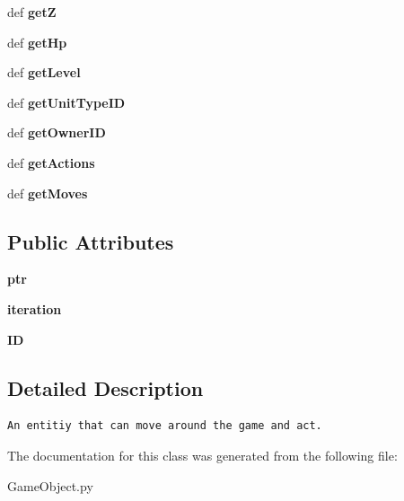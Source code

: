 \begin{CompactItemize}
\item 
\hypertarget{classGameObject_1_1Unit_4b32febb0f80ed604833338af2103b16}{
def \textbf{getZ}}
\label{classGameObject_1_1Unit_4b32febb0f80ed604833338af2103b16}

\item 
\hypertarget{classGameObject_1_1Unit_a0e958b475f8e784cab9e443405cc233}{
def \textbf{getHp}}
\label{classGameObject_1_1Unit_a0e958b475f8e784cab9e443405cc233}

\item 
\hypertarget{classGameObject_1_1Unit_b2bf3bbbd066d3b1ec4a6eac3819bb63}{
def \textbf{getLevel}}
\label{classGameObject_1_1Unit_b2bf3bbbd066d3b1ec4a6eac3819bb63}

\item 
\hypertarget{classGameObject_1_1Unit_5dc929b411abd60ea05bc9a45f53ed2c}{
def \textbf{getUnitTypeID}}
\label{classGameObject_1_1Unit_5dc929b411abd60ea05bc9a45f53ed2c}

\item 
\hypertarget{classGameObject_1_1Unit_7a78dc10a8f05d47c6216f0a1cee864e}{
def \textbf{getOwnerID}}
\label{classGameObject_1_1Unit_7a78dc10a8f05d47c6216f0a1cee864e}

\item 
\hypertarget{classGameObject_1_1Unit_d616480400b131d3faad00f63f553c37}{
def \textbf{getActions}}
\label{classGameObject_1_1Unit_d616480400b131d3faad00f63f553c37}

\item 
\hypertarget{classGameObject_1_1Unit_5aa36bd2ed0fa42becc2f3e15c4a2fbb}{
def \textbf{getMoves}}
\label{classGameObject_1_1Unit_5aa36bd2ed0fa42becc2f3e15c4a2fbb}

\end{CompactItemize}
\subsection*{Public Attributes}
\begin{CompactItemize}
\item 
\hypertarget{classGameObject_1_1Unit_eed6c6641d9ab913c271e07ce91f66dc}{
\textbf{ptr}}
\label{classGameObject_1_1Unit_eed6c6641d9ab913c271e07ce91f66dc}

\item 
\hypertarget{classGameObject_1_1Unit_a9e881997b25f4452c57074760815d63}{
\textbf{iteration}}
\label{classGameObject_1_1Unit_a9e881997b25f4452c57074760815d63}

\item 
\hypertarget{classGameObject_1_1Unit_aea5d9c834951a5d317c85b8b4e95f65}{
\textbf{ID}}
\label{classGameObject_1_1Unit_aea5d9c834951a5d317c85b8b4e95f65}

\end{CompactItemize}


\subsection{Detailed Description}


\footnotesize\begin{verbatim}An entitiy that can move around the game and act.
\end{verbatim}
\normalsize
 

The documentation for this class was generated from the following file:\begin{CompactItemize}
\item 
GameObject.py\end{CompactItemize}
